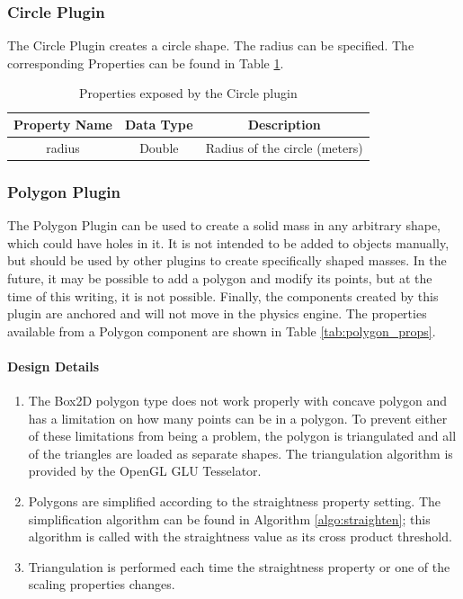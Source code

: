 \begin{itemize}
\subsubsection*{Circle Plugin}
The Circle Plugin creates a circle shape. The radius
can be specified. The corresponding Properties can be found in Table \ref{tab:circle_props}.

\begin{table}[h!]
	\centering
	\caption{Properties exposed by the Circle plugin}
	\label{tab:circle_props}
	\begin{tabular}{c|c|c}
	Property Name & Data Type & Description\\ \hline \hline
	radius & Double & Radius of the circle (meters)
	\end{tabular}
\end{table}

\subsubsection*{Polygon Plugin\label{sec:polygon}}
The Polygon Plugin can be used to create a solid mass in any arbitrary shape, which could have holes in it. It is not intended to be added to objects manually, but should be
used by other plugins to create specifically shaped masses. In the future, it may be possible to add a polygon and modify its points, but at the time of this writing, it is not possible. Finally, the components created by this plugin are anchored and will not move in the physics engine. The properties available from a Polygon component are shown in Table \ref{tab:polygon_props}.

\paragraph{Design Details}
\begin{enumerate}
\item The Box2D polygon type does not work properly with concave polygon and has a limitation on how many points can be in a polygon. To prevent either of these limitations from being a problem, the polygon is triangulated and all of the triangles are loaded as separate shapes. The triangulation algorithm is provided by the OpenGL GLU Tesselator.
\item Polygons are simplified according to the straightness property setting. The simplification algorithm can be found in Algorithm \ref{algo:straighten}; this algorithm is called with the straightness value as its cross product threshold.
\item Triangulation is performed each time the straightness property or one of the scaling properties changes.
\end{enumerate}


\end{itemize}
